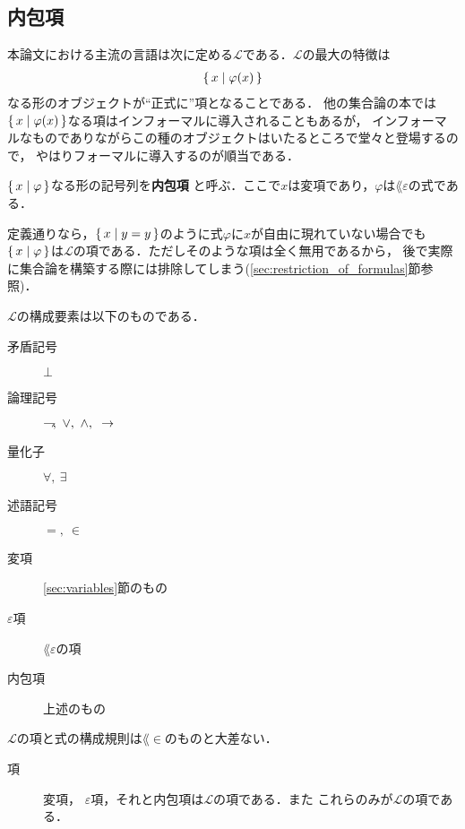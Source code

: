 \subsection{内包項}
	本論文における主流の言語は次に定める$\mathcal{L}$である．$\mathcal{L}$の最大の特徴は
	\begin{align}
		\{\, x \mid \varphi(x)\, \}
	\end{align}
	なる形のオブジェクトが``正式に''項となることである．
	他の集合論の本では$\{\, x \mid \varphi(x)\, \}$なる項はインフォーマルに導入されることもあるが，
	インフォーマルなものでありながらこの種のオブジェクトはいたるところで堂々と登場するので，
	やはりフォーマルに導入するのが順当である．
	
	\begin{screen}
		\begin{metadfn}[内包項]
			$\{\, x \mid \varphi\, \}$なる形の記号列を{\bf 内包項}
			と呼ぶ．ここで$x$は変項であり，$\varphi$は$\lang{\varepsilon}$の式である．
		\end{metadfn}
	\end{screen}
	
	定義通りなら，$\{\, x \mid y=y\, \}$のように式$\varphi$に$x$が自由に現れていない場合でも
	$\{\, x \mid \varphi\, \}$は$\mathcal{L}$の項である．ただしそのような項は全く無用であるから，
	後で実際に集合論を構築する際には排除してしまう(\ref{sec:restriction_of_formulas}節参照)．
	
	$\mathcal{L}$の構成要素は以下のものである．
	
	\begin{description}
		\item[矛盾記号] $\bot$
		\item[論理記号] $\negation,\ \vee,\ \wedge,\ \rarrow$
		\item[量化子] $\forall,\ \exists$
		\item[述語記号] $=,\ \in$
		\item[変項] \ref{sec:variables}節のもの
		\item[$\varepsilon$項] $\lang{\varepsilon}$の項
		\item[内包項] 上述のもの
	\end{description}
	
	$\mathcal{L}$の項と式の構成規則は$\lang{\in}$のものと大差ない．
	
	\begin{description}
		\item[項] 変項， $\varepsilon$項，それと内包項は$\mathcal{L}$の項である．また
			これらのみが$\mathcal{L}$の項である．
	\end{description}
	
